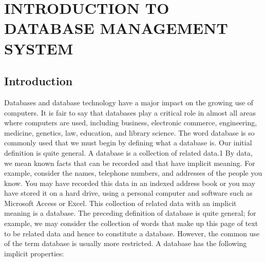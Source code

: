 \chapter{INTRODUCTION TO DATABASE MANAGEMENT SYSTEM}

\section{Introduction}
Databases and database technology have a major impact on the growing use of computers. It is fair to say that databases play a critical role in almost all areas where computers are used, including business, electronic commerce, engineering, medicine, genetics, law, education, and library science. The word database is so commonly used that we must begin by defining what a database is. Our initial definition is quite general. A database is a collection of related data.1 By data, we mean known facts that can be recorded and that have implicit meaning. For example, consider the names, telephone numbers, and addresses of the people you know. You may have recorded this data in an indexed address book or you may have stored it on a hard drive, using a personal computer and software such as Microsoft Access or Excel. This collection of related data with an implicit meaning is a database. The preceding definition of database is quite general; for example, we may consider the collection of words that make up this page of text to be related data and hence to constitute a database. However, the common use of the term database is usually more restricted. 
A database has the following implicit properties:


